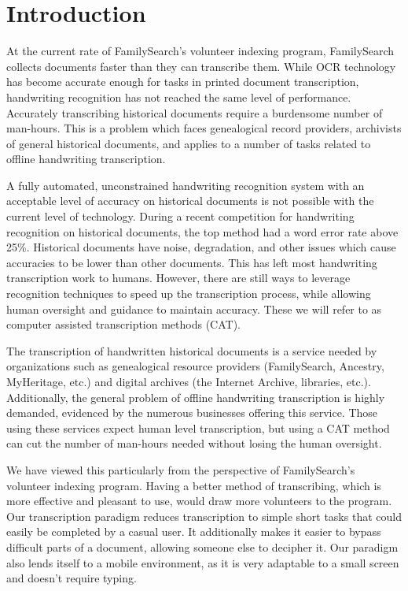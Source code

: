 \documentclass[ms]{byuprop}
\title{\Title}
\author{\Author}
\begin{document}
\maketitle

\section{Introduction}
At the current rate of FamilySearch's volunteer indexing program, FamilySearch collects documents faster than they can transcribe them. While OCR technology has become accurate enough for tasks in printed document transcription, handwriting recognition has not reached the same level of performance. Accurately transcribing historical documents require a burdensome number of man-hours. This is a problem which faces genealogical record providers, archivists of general historical documents, and applies to a number of tasks related to offline handwriting transcription.

A fully automated, unconstrained handwriting recognition system with an acceptable level of accuracy on historical documents is not possible with the current level of technology. During a recent competition for handwriting recognition on historical documents, the top method had a word error rate above 25\%\cite{icdarComp2015}.  Historical documents have noise, degradation, and other issues which cause accuracies to be lower than other documents. This has left most handwriting transcription work to humans. \iffalse To transcribe (TODO) pages of census documents it took (TODO) man hours.\fi However, there are still ways to leverage recognition techniques to speed up the transcription process, while allowing human oversight and guidance to maintain accuracy. These we will refer to as computer assisted transcription methods (CAT).

The transcription of handwritten historical documents is a service needed by organizations such as genealogical resource providers (FamilySearch, Ancestry, MyHeritage, etc.) and digital archives (the Internet Archive, libraries, etc.). Additionally, the general problem of offline handwriting transcription is highly demanded, evidenced by the numerous businesses offering this service. Those using these services expect human level transcription, but using a CAT method can cut the number of man-hours needed without losing the human oversight.

We have viewed this particularly from the perspective of FamilySearch's volunteer indexing program. Having a better method of transcribing, which is more effective and pleasant to use, would  draw more volunteers to the program. Our transcription paradigm reduces transcription to simple short tasks that could easily be completed by a casual user. It additionally makes it easier to bypass difficult parts of a document, allowing someone else to decipher it. Our paradigm also lends itself to a mobile environment, as it is very adaptable to a small screen and doesn't require typing.
\end{document}
